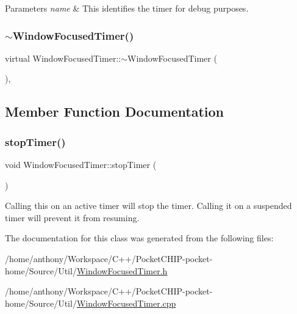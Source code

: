 \begin{DoxyParams}{Parameters}
{\em name} & This identifies the timer for debug purposes. \\
\hline
\end{DoxyParams}
\mbox{\label{classWindowFocusedTimer_ab6b2e47b76928ee60580e124bbaf0823}} 
\subsubsection{\texorpdfstring{$\sim$\+Window\+Focused\+Timer()}{~WindowFocusedTimer()}}
{\footnotesize\ttfamily virtual Window\+Focused\+Timer\+::$\sim$\+Window\+Focused\+Timer (\begin{DoxyParamCaption}{ }\end{DoxyParamCaption})\hspace{0.3cm}{\ttfamily [inline]}, {\ttfamily [virtual]}}



\subsection{Member Function Documentation}
\mbox{\label{classWindowFocusedTimer_adecff2108f614ab410d59a1783ddfa82}} 
\subsubsection{\texorpdfstring{stop\+Timer()}{stopTimer()}}
{\footnotesize\ttfamily void Window\+Focused\+Timer\+::stop\+Timer (\begin{DoxyParamCaption}{ }\end{DoxyParamCaption})}

Calling this on an active timer will stop the timer. Calling it on a suspended timer will prevent it from resuming. 

The documentation for this class was generated from the following files\+:\begin{DoxyCompactItemize}
\item 
/home/anthony/\+Workspace/\+C++/\+Pocket\+C\+H\+I\+P-\/pocket-\/home/\+Source/\+Util/\mbox{\hyperlink{WindowFocusedTimer_8h}{Window\+Focused\+Timer.\+h}}\item 
/home/anthony/\+Workspace/\+C++/\+Pocket\+C\+H\+I\+P-\/pocket-\/home/\+Source/\+Util/\mbox{\hyperlink{WindowFocusedTimer_8cpp}{Window\+Focused\+Timer.\+cpp}}\end{DoxyCompactItemize}
